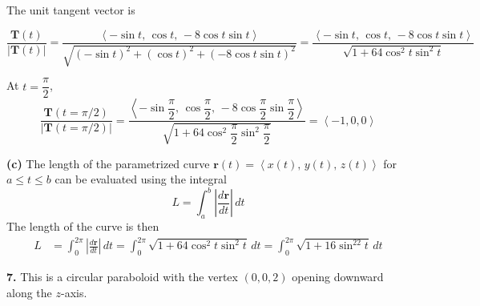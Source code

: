 \documentclass{article}
\begin{document}
The unit tangent vector is

\[\frac{\mathbf T(t)}{\left|\mathbf T(t)\right|}=\frac{\left\langle-\sin t,\,\cos t,\,-8\cos t\sin t\right\rangle}{\sqrt{(-\sin t)^2+(\cos t)^2+(-8\cos t\sin t)^2}}=\frac{\left\langle-\sin t,\,\cos t,\,-8\cos t\sin t\right\rangle}{\sqrt{1+64\cos^2t\sin^2t}}\]

At $t=\dfrac\pi2$,
\[\frac{\mathbf T(t=\pi/2)}{|\mathbf T(t=\pi/2)|}=\frac{\left\langle-\sin\dfrac\pi2,\,\cos \dfrac\pi2,\,-8\cos\dfrac\pi2\sin\dfrac\pi2\right\rangle}{\sqrt{1+64\cos^2\dfrac\pi2\sin^2\dfrac\pi2}}=\boxed{\left\langle-1,0,0\right\rangle}\]

\textbf{(c)} The length of the parametrized curve $\mathbf{r}(t)=\left\langle x(t),\,y(t),\,z(t)\right\rangle$ for $a\leq t\leq b$ can be evaluated using the integral
\[L=\int_a^b\left|\frac{d\mathbf r}{dt}\right|\,dt\]
The length of the curve is then
\begin{align*}L&=\int_0^{2\pi}\left|\frac{d\mathbf r}{dt}\right|\,dt=\boxed{\int_0^{2\pi}\sqrt{1+64\cos^2t\sin^2t}\,dt=\int_0^{2\pi}\sqrt{1+16\sin^22t}\,dt}\end{align*}

\vspace{1em}

\textbf{7.} This is a circular paraboloid with the vertex $(0,0,2)$ opening downward along the $z$-axis.
\end{document}
